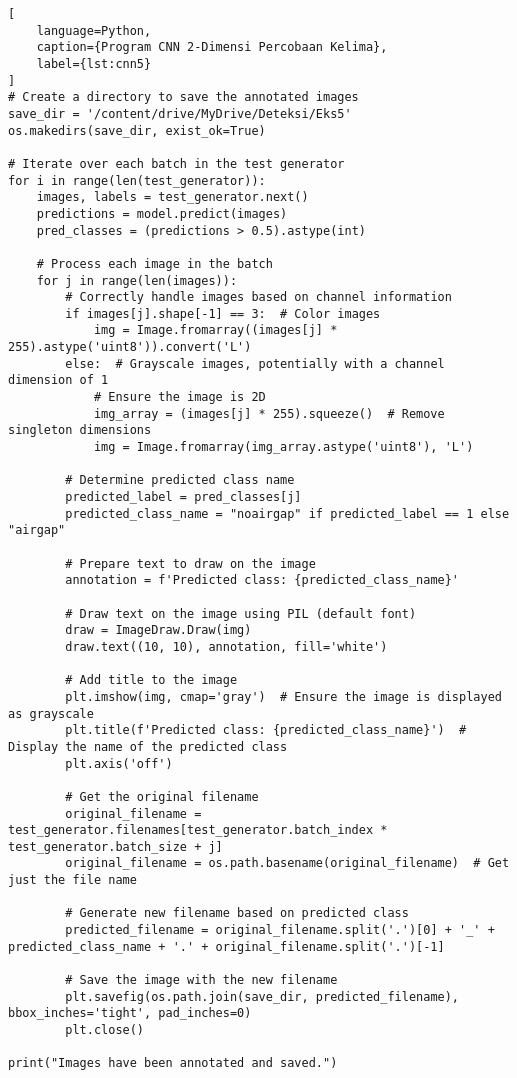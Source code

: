 \begin{lstlisting}[
    language=Python,
    caption={Program CNN 2-Dimensi Percobaan Kelima},
    label={lst:cnn5}
]
# Create a directory to save the annotated images
save_dir = '/content/drive/MyDrive/Deteksi/Eks5'
os.makedirs(save_dir, exist_ok=True)

# Iterate over each batch in the test generator
for i in range(len(test_generator)):
    images, labels = test_generator.next()
    predictions = model.predict(images)
    pred_classes = (predictions > 0.5).astype(int)

    # Process each image in the batch
    for j in range(len(images)):
        # Correctly handle images based on channel information
        if images[j].shape[-1] == 3:  # Color images
            img = Image.fromarray((images[j] * 255).astype('uint8')).convert('L')
        else:  # Grayscale images, potentially with a channel dimension of 1
            # Ensure the image is 2D
            img_array = (images[j] * 255).squeeze()  # Remove singleton dimensions
            img = Image.fromarray(img_array.astype('uint8'), 'L')

        # Determine predicted class name
        predicted_label = pred_classes[j]
        predicted_class_name = "noairgap" if predicted_label == 1 else "airgap"

        # Prepare text to draw on the image
        annotation = f'Predicted class: {predicted_class_name}'

        # Draw text on the image using PIL (default font)
        draw = ImageDraw.Draw(img)
        draw.text((10, 10), annotation, fill='white')

        # Add title to the image
        plt.imshow(img, cmap='gray')  # Ensure the image is displayed as grayscale
        plt.title(f'Predicted class: {predicted_class_name}')  # Display the name of the predicted class
        plt.axis('off')

        # Get the original filename
        original_filename = test_generator.filenames[test_generator.batch_index * test_generator.batch_size + j]
        original_filename = os.path.basename(original_filename)  # Get just the file name

        # Generate new filename based on predicted class
        predicted_filename = original_filename.split('.')[0] + '_' + predicted_class_name + '.' + original_filename.split('.')[-1]

        # Save the image with the new filename
        plt.savefig(os.path.join(save_dir, predicted_filename), bbox_inches='tight', pad_inches=0)
        plt.close()

print("Images have been annotated and saved.")
\end{lstlisting}

